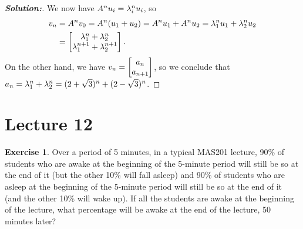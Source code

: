 \documentclass[a4paper]{amsart}
\theoremstyle{definition}
\newtheorem{exercise}{Exercise}
\newenvironment{solution}{\begin{proof}[\textbf{Solution:}] \vphantom{u}}{\end{proof}}
\begin{document}
\begin{solution}
 We now have $A^nu_i=\lambda_i^nu_i$, so
 \begin{align*}
  v_n &= A^nv_0 = A^n(u_1+u_2) = A^nu_1+A^nu_2 = \lambda_1^nu_1+\lambda_2^nu_2 \\
      &= \left[\begin{matrix} \lambda_1^n + \lambda_2^n \\ \lambda_1^{n+1} + \lambda_2^{n+1} \end{matrix}\right].      
 \end{align*}
 On the other hand, we have $v_n=\left[\begin{matrix} a_n\\ a_{n+1}\end{matrix}\right]$, so we
 conclude that $a_n=\lambda_1^n+\lambda_2^n=(2+\sqrt{3})^n+(2-\sqrt{3})^n$.
\end{solution}

\section{Lecture 12}

\begin{exercise}\label{ex-markov-i}
 Over a period of 5 minutes, in a typical MAS201 lecture, 90\% of
 students who are awake at the beginning of the 5-minute period will
 still be so at the end of it (but the other 10\% will fall asleep)
 and 90\% of students who are asleep at the beginning of the 5-minute
 period will still be so at the end of it (and the other 10\% will
 wake up). If all the students are awake at the beginning of the
 lecture, what percentage will be awake at the end of the lecture, 50
 minutes later?
\end{exercise}
\end{document}
